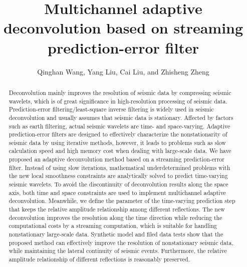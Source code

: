 
\title{Multichannel adaptive deconvolution based on streaming
  prediction-error filter}

\renewcommand{\thefootnote}{\fnsymbol{footnote}}
{}
             
\address{
College of Geo-exploration Science and Technology,\\
Jilin University \\
No.938 Xi minzhu street \\
Changchun, China, 130026}

\author{Qinghan Wang, Yang Liu, Cai Liu, and Zhisheng Zheng}


\maketitle

\begin{abstract}
  Deconvolution mainly improves the resolution of seismic data by
  compressing seismic wavelets, which is of great significance in
  high-resolution processing of seismic data. Prediction-error
  filtering/least-square inverse filtering is widely used in seismic
  deconvolution and usually assumes that seismic data is
  stationary. Affected by factors such as earth filtering, actual
  seismic wavelets are time- and space-varying. Adaptive
  prediction-error filters are designed to effectively characterize
  the nonstationarity of seismic data by using iterative methods,
  however, it leads to problems such as slow calculation speed and
  high memory cost when dealing with large-scale data. We have
  proposed an adaptive deconvolution method based on a streaming
  prediction-error filter. Instead of using slow iterations,
  mathematical underdetermined problems with the new local smoothness
  constraints are analytically solved to predict time-varying seismic
  wavelets. To avoid the discontinuity of deconvolution results along
  the space axis, both time and space constraints are used to
  implement multichannel adaptive deconvolution. Meanwhile, we define
  the parameter of the time-varying prediction step that keeps the
  relative amplitude relationship among different reflections. The new
  deconvolution improves the resolution along the time direction while
  reducing the computational costs by a streaming computation, which
  is suitable for handling nonstationary large-scale data. Synthetic
  model and filed data tests show that the proposed method can
  effectively improve the resolution of nonstationary seismic data,
  while maintaining the lateral continuity of seismic
  events. Furthermore, the relative amplitude relationship of
  different reflections is reasonably preserved.
\end{abstract}

